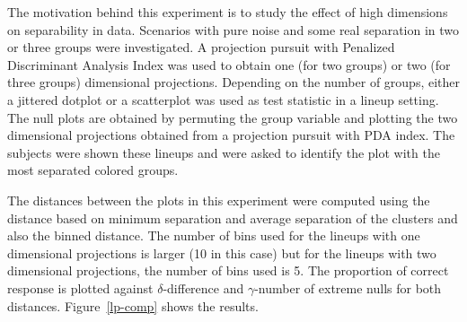 \documentclass[12pt]{article}\usepackage[]{graphicx}\usepackage[]{color}
\begin{document}
The motivation behind this experiment is to study the effect of high dimensions on separability in data. Scenarios with pure noise and some real separation in two or three groups were investigated. %
A projection pursuit with Penalized Discriminant Analysis Index \citep{lee:2009} was used to obtain one (for two groups) or two (for three groups) dimensional projections. 
Depending on the number of groups, either a jittered dotplot or a scatterplot was used as test statistic in a lineup setting. %
The null plots are obtained by permuting the group variable and plotting the two dimensional projections obtained from a projection pursuit with PDA index.
The subjects were shown these lineups and were asked to identify the plot with the most separated colored groups. %



The distances between the plots in this experiment were computed using the distance based on minimum separation and average separation of the clusters and also the binned distance. The number of bins used for the lineups with one dimensional projections is larger (10 in this case) but for the lineups with two dimensional projections, the number of bins used is 5. The proportion of correct response is plotted against $\delta$-difference and $\gamma$-number of extreme nulls for both distances. Figure~\ref{lp-comp} shows the results.
\end{document}
